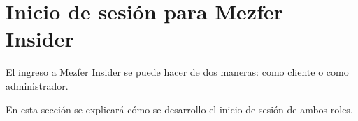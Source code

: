 \section{Inicio de sesión para Mezfer Insider}
El ingreso a Mezfer Insider se puede hacer de dos maneras: como cliente o como administrador.

En esta sección se explicará cómo se desarrollo el inicio de sesión de ambos roles.
    
    